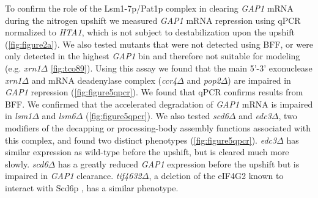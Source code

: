To confirm the role of the Lsm1-7p/Pat1p  complex in clearing \textit{GAP1}
mRNA during the nitrogen upshift we measured \textit{GAP1} mRNA
repression using qPCR normalized to
\textit{HTA1}, which is not subject to destabilization upon the upshift
(\autoref{fig:figure2a}). We also tested mutants that were not detected using BFF,
or were only detected in the highest \textit{GAP1} bin and therefore
not suitable for modeling
(e.g. \textit{xrn1}$\Delta$ \autoref{fig:tco89}). 
Using this assay we found that the main 5'-3' 
exonuclease \textit{xrn1}$\Delta$ 
and mRNA deadenylase complex (\textit{ccr4}$\Delta$ and
\textit{pop2}$\Delta$) are impaired in \textit{GAP1} repression 
(\autoref{fig:figure5qpcr}).
We found that qPCR confirms results from BFF.
We confirmed that the accelerated degradation of \textit{GAP1} mRNA is impaired
in \textit{lsm1}$\Delta$ and \textit{lsm6}$\Delta$ 
(\autoref{fig:figure5qpcr}). 
We also tested
\textit{scd6}$\Delta$ and \textit{edc3}$\Delta$, two modifiers of the
decapping or processing-body
assembly functions associated with this complex, and found two
distinct phenotypes (\autoref{fig:figure5qpcr}). \textit{edc3}$\Delta$ has similar expression 
as wild-type before the upshift, but is cleared much more slowly.
\textit{scd6}$\Delta$ has a greatly reduced \textit{GAP1} expression
before the upshift but is impaired in \textit{GAP1} clearance. 
\textit{tif4632}$\Delta$, a deletion of the eIF4G2
known to interact with Scd6p \parencite{rajyaguru2012scd6}, 
has a similar phenotype. 

